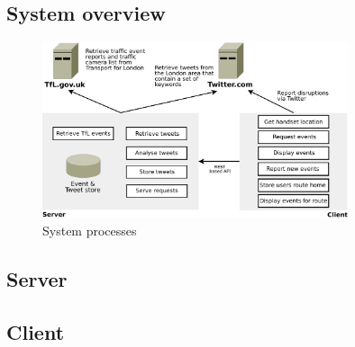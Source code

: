 
\subsection{System overview}

\begin{figure}[htb]
\centering
\includegraphics[width=0.8\textwidth]{images/design/system_components.pdf}
\caption{System processes}
\label{fig:system_components}
\end{figure}


\subsection{Server}
  

\subsection{Client}
  


